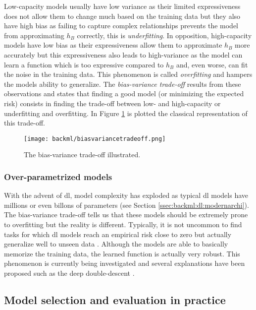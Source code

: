 Low-capacity models usually have low variance as their limited expressiveness does not allow them to change much based on the training data but they also have high bias as failing to capture complex relationships prevents the model from approximating $h_B$ correctly, this is \textit{underfitting}. In opposition, high-capacity models have low bias as their expressiveness allow them to approximate $h_B$ more accurately but this expressiveness also leads to high-variance as the model can learn a function which is too expressive compared to $h_B$ and, even worse, can fit the noise in the training data. This phenomenon is called \textit{overfitting} and hampers the models ability to generalize. The \textit{bias-variance trade-off} results from these observations and states that finding a good model (or minimizing the expected risk) consists in finding the trade-off between low- and high-capacity or underfitting and overfitting. In Figure \ref{fig:backml:biasvariancetradeoff} is plotted the classical representation of this trade-off.

\begin{figure}
  \centering
  \texttt{[image: backml/biasvariancetradeoff.png]}
  \caption{The bias-variance trade-off illustrated.}
  \label{fig:backml:biasvariancetradeoff}
\end{figure}

\subsubsection{Over-parametrized models}

With the advent of \acrlong{dl}, model complexity has exploded as typical \acrlong{dl} models have millions or even billons of parameters (see Section \ref{ssec:backml:dl:modernarchi}). The bias-variance trade-off tells us that these models should be extremely prone to overfitting but the reality is different. Typically, it is not uncommon to find tasks for which \acrlong{dl} models reach an empirical risk close to zero but actually generalize well to unseen data \parencite{zhang2021understanding}. Although the models are able to basically memorize the training data, the learned function is actually very robust. This phenomenon is currently being investigated and several explanations have been proposed such as the deep double-descent \parencite{belkin2019reconciling}. 

\subsection{Model selection and evaluation in practice}

